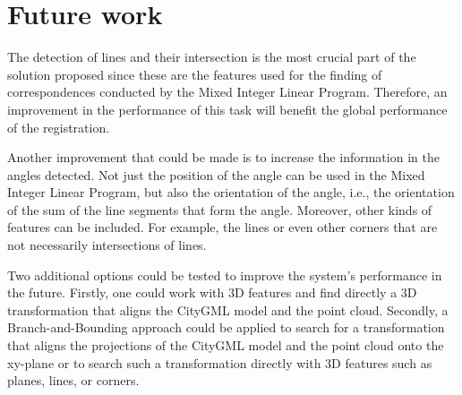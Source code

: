     \section{Future work}
        The detection of lines and their intersection is the most crucial part of the solution proposed since these are the features used 
        for the finding of correspondences conducted by the Mixed Integer Linear Program. 
        Therefore, an improvement in the performance of this task will benefit the global performance of the registration.

        Another improvement that could be made is to increase the information in the angles detected. 
        Not just the position of the angle can be used in the Mixed Integer Linear Program, but also the orientation of the angle, 
        i.e., the orientation of the sum of the line segments that form the angle.
        Moreover, other kinds of features can be included. For example, the lines or even other corners that are not necessarily intersections of lines.

        Two additional options could be tested to improve the system’s performance in the future. 
        Firstly, one could work with 3D features and find directly a 3D transformation that aligns the CityGML model and the point cloud. 
        Secondly, a Branch-and-Bounding approach \cite{Bazin_2013_abranchandbound,Breuel_2003_implementation,Brown_2015_globally,Brown_2019_afamily} 
        could be applied to search for a transformation that aligns the projections of the CityGML model and the point cloud onto the xy-plane 
        or to search such a transformation directly with 3D features such as planes, lines, or corners.  


